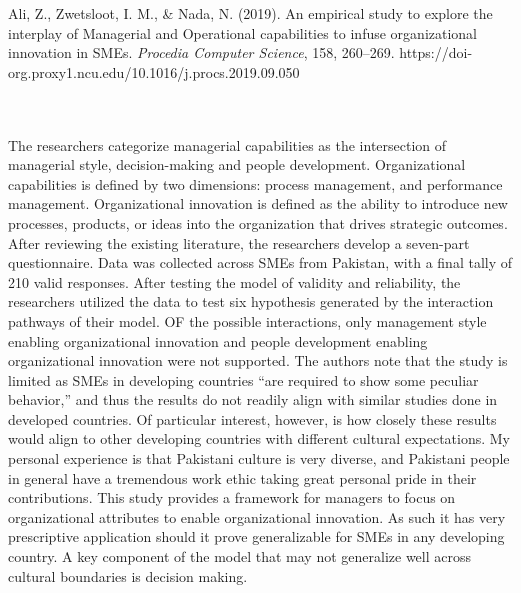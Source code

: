 \documentclass{apa7}
\begin{document}
\bigskip
\hfill\begin{minipage}{\dimexpr\textwidth-1in}
\begin{hangparas}{.25in}{1}
Ali, Z., Zwetsloot, I. M., \& Nada, N. (2019). An empirical study to explore the interplay of Managerial and Operational capabilities to infuse organizational innovation in SMEs. \textit{Procedia Computer Science}, 158, 260–269. https://doi-org.proxy1.ncu.edu/10.1016/j.procs.2019.09.050
\end{hangparas}
\xdef\tpd{\the\prevdepth}
\end{minipage}
\\
\\
The researchers categorize managerial capabilities as the intersection of managerial style, decision-making and people development. Organizational capabilities is defined by two dimensions: process management, and performance management. Organizational innovation is defined as the ability to introduce new processes, products, or ideas into the organization that drives strategic outcomes. After reviewing the existing literature, the researchers develop a seven-part questionnaire. Data was collected across SMEs from Pakistan, with a final tally of 210 valid responses. After testing the model of validity and reliability, the researchers utilized the data to test six hypothesis generated by the interaction pathways of their model. OF the possible interactions, only management style enabling organizational innovation and people development enabling organizational innovation were not supported. The authors note that the study is limited as SMEs in developing countries ``are required to show some peculiar behavior,'' and thus the results do not readily align with similar studies done in developed countries. Of particular interest, however, is how closely these results would align to other developing countries with different cultural expectations. My personal experience is that Pakistani culture is very diverse, and  Pakistani people in general have a tremendous work ethic taking great personal pride in their contributions. This study provides a framework for managers to focus on organizational attributes to enable organizational innovation. As such it has very prescriptive application should it prove generalizable for SMEs in any developing country. A key component of the model that may not generalize well across cultural boundaries is decision making.
\end{document}

